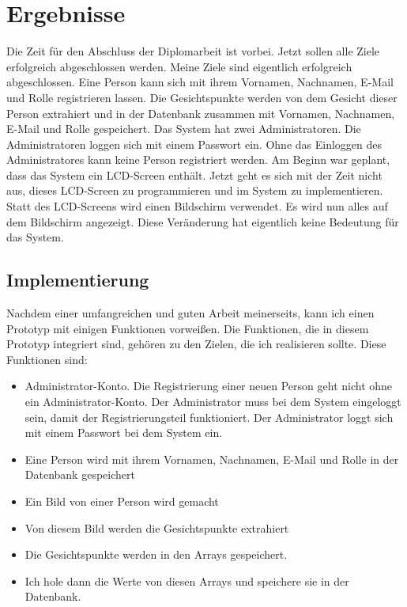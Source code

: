 \section{Ergebnisse}
Die Zeit f\"ur den Abschluss der Diplomarbeit ist vorbei. Jetzt sollen alle Ziele erfolgreich abgeschlossen werden. Meine Ziele sind eigentlich erfolgreich abgeschlossen. Eine Person kann sich mit ihrem Vornamen, Nachnamen, E-Mail und Rolle registrieren lassen. Die Gesichtspunkte werden von dem Gesicht dieser Person extrahiert und in der Datenbank zusammen mit Vornamen, Nachnamen, E-Mail und Rolle gespeichert. Das System hat zwei Administratoren. Die Administratoren loggen sich mit einem Passwort ein. Ohne das Einloggen des Administratores kann keine Person registriert werden. Am Beginn war geplant, dass das System ein LCD-Screen enth\"alt. Jetzt geht es sich mit der Zeit nicht aus, dieses LCD-Screen zu programmieren und im System zu implementieren. Statt des LCD-Screens wird einen Bildschirm verwendet. Es wird nun alles auf dem Bildschirm angezeigt. Diese Ver\"anderung hat eigentlich keine Bedeutung f\"ur das System. 
\subsection{Implementierung}
Nachdem einer umfangreichen und guten Arbeit meinerseits, kann ich einen Prototyp mit einigen Funktionen vorwei{\ss}en. Die Funktionen, die in diesem Prototyp integriert sind, geh\"oren zu den Zielen, die ich realisieren sollte. Diese Funktionen sind: 
\begin{itemize}
	\item Administrator-Konto. Die Registrierung einer neuen Person geht nicht ohne ein Administrator-Konto. Der Administrator muss bei dem System eingeloggt sein, damit der Registrierungsteil funktioniert. Der Administrator loggt sich mit einem Passwort bei dem System ein. 
	\item Eine Person wird mit ihrem Vornamen, Nachnamen, E-Mail und Rolle in der Datenbank gespeichert
	\item Ein Bild von einer Person wird gemacht
	\item Von diesem Bild werden die Gesichtspunkte extrahiert
	\item Die Gesichtspunkte werden in den Arrays gespeichert.
	\item Ich hole dann die Werte von diesen Arrays und speichere sie in der Datenbank.
\end{itemize}